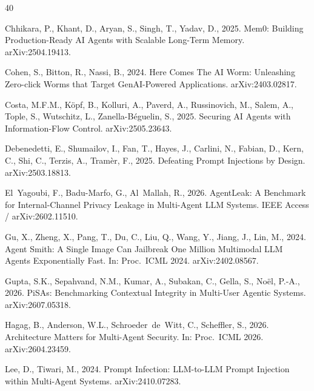 \documentclass[preprint,12pt,authoryear]{elsarticle}
\begin{document}
\begin{thebibliography}{40}
\providecommand{\natexlab}[1]{#1}
\providecommand{\url}[1]{\texttt{#1}}

Chhikara, P., Khant, D., Aryan, S., Singh, T., Yadav, D., 2025. Mem0: Building Production-Ready AI Agents with Scalable Long-Term Memory. arXiv:2504.19413.

Cohen, S., Bitton, R., Nassi, B., 2024. Here Comes The AI Worm: Unleashing Zero-click Worms that Target GenAI-Powered Applications. arXiv:2403.02817.

Costa, M.F.M., K\"opf, B., Kolluri, A., Paverd, A., Russinovich, M., Salem, A., Tople, S., Wutschitz, L., Zanella-B\'eguelin, S., 2025. Securing AI Agents with Information-Flow Control. arXiv:2505.23643.

Debenedetti, E., Shumailov, I., Fan, T., Hayes, J., Carlini, N., Fabian, D., Kern, C., Shi, C., Terzis, A., Tram\`er, F., 2025. Defeating Prompt Injections by Design. arXiv:2503.18813.

El~Yagoubi, F., Badu-Marfo, G., Al~Mallah, R., 2026. AgentLeak: A Benchmark for Internal-Channel Privacy Leakage in Multi-Agent LLM Systems. IEEE Access / arXiv:2602.11510.

Gu, X., Zheng, X., Pang, T., Du, C., Liu, Q., Wang, Y., Jiang, J., Lin, M., 2024. Agent Smith: A Single Image Can Jailbreak One Million Multimodal LLM Agents Exponentially Fast. In: Proc.\ ICML 2024. arXiv:2402.08567.

Gupta, S.K., Sepahvand, N.M., Kumar, A., Subakan, C., Gella, S., No\"el, P.-A., 2026. PiSAs: Benchmarking Contextual Integrity in Multi-User Agentic Systems. arXiv:2607.05318.

Hagag, B., Anderson, W.L., Schroeder~de~Witt, C., Scheffler, S., 2026. Architecture Matters for Multi-Agent Security. In: Proc.\ ICML 2026. arXiv:2604.23459.

Lee, D., Tiwari, M., 2024. Prompt Infection: LLM-to-LLM Prompt Injection within Multi-Agent Systems. arXiv:2410.07283.


\end{thebibliography}
\end{document}
